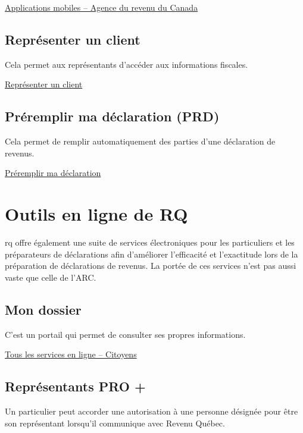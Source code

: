 \href{https://www.canada.ca/fr/agence-revenu/services/services-electroniques/applications-mobiles-arc.html}{Applications mobiles – Agence du revenu du Canada}


\subsection{Représenter un client}
Cela permet aux représentants d'accéder aux informations fiscales.

\href{https://www.canada.ca/fr/agence-revenu/services/services-electroniques/representer-client.html}{Représenter un client}


\subsection{Préremplir ma déclaration (PRD)}
Cela permet de remplir automatiquement des parties d'une déclaration de revenus.

\href{https://www.canada.ca/fr/agence-revenu/services/services-electroniques/a-propos-preremplir-declaration.html}{Préremplir ma déclaration}



\section{Outils en ligne de RQ}
\begin{intro}
	\acrfull{rq} offre également une suite de services électroniques pour les particuliers et les préparateurs de déclarations afin d'améliorer l'efficacité et l'exactitude lors de la préparation de déclarations de revenus. La portée de ces services n'est pas aussi vaste que celle de l'ARC.
\end{intro}


\subsection{Mon dossier}
C'est un portail qui permet de consulter ses propres informations.

\href{https://www.revenuquebec.ca/fr/services-en-ligne/services-en-ligne/services-en-ligne/citoyens/}{Tous les services en ligne – Citoyens}


\subsection{Représentants PRO +}
Un particulier peut accorder une autorisation à une personne désignée pour être son représentant lorsqu'il communique avec Revenu Québec.

